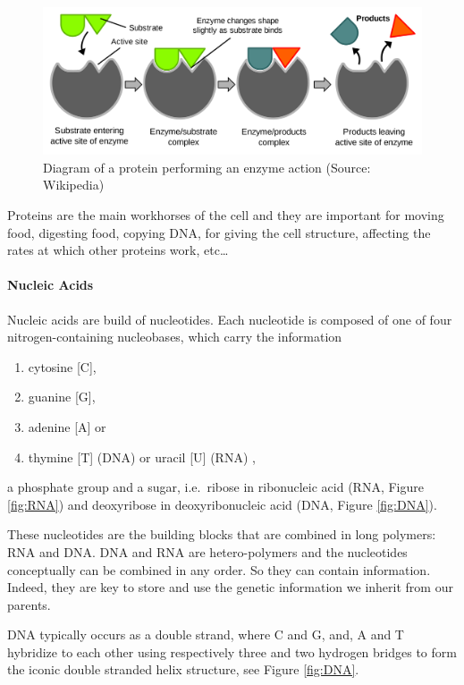 \documentclass[
  11pt,
]{book}
\providecommand{\tightlist}{%
  \setlength{\itemsep}{0pt}\setlength{\parskip}{0pt}}
\begin{document}
\begin{figure}

{\centering \includegraphics[width=0.5\linewidth]{./figs/EnzymePadlockKey} 

}

\caption{Diagram of a protein performing an enzyme action (Source: Wikipedia)}\label{fig:enzyme}
\end{figure}

Proteins are the main workhorses of the cell and they are important for moving food, digesting food, copying DNA, for giving the cell structure, affecting the rates at which other proteins work, etc\ldots{}

\hypertarget{sectionNucleicAcids}{%
\paragraph{Nucleic Acids}\label{sectionNucleicAcids}}

Nucleic acids are build of nucleotides.
Each nucleotide is composed of one of four nitrogen-containing nucleobases, which carry the information

\begin{enumerate}
\def\labelenumi{\arabic{enumi}.}
\tightlist
\item
  cytosine {[}C{]},
\item
  guanine {[}G{]},
\item
  adenine {[}A{]} or
\item
  thymine {[}T{]} (DNA) or uracil {[}U{]} (RNA) ,
\end{enumerate}

a phosphate group and a sugar, i.e.~ribose in ribonucleic acid (RNA, Figure \ref{fig:RNA}) and deoxyribose in deoxyribonucleic acid (DNA, Figure \ref{fig:DNA}).

These nucleotides are the building blocks that are combined in long polymers: RNA and DNA.
DNA and RNA are hetero-polymers and the nucleotides conceptually can be combined in any order.
So they can contain information.
Indeed, they are key to store and use the genetic information we inherit from our parents.

DNA typically occurs as a double strand, where C and G, and, A and T hybridize to each other using respectively three and two hydrogen bridges to form the iconic double stranded helix structure, see Figure \ref{fig:DNA}.
\end{document}
